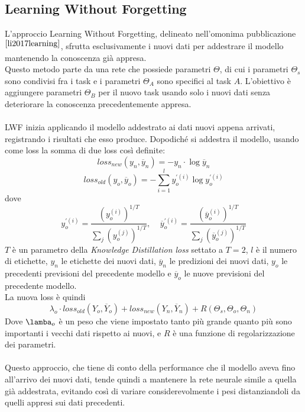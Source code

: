 \subsection{Learning Without Forgetting}
L'approccio Learning Without Forgetting, delineato nell'omonima pubblicazione$^{\cite{li2017learning}}$, sfrutta esclusivamente i nuovi dati per addestrare il modello mantenendo la conoscenza già appresa.\\
Questo metodo parte da una rete che possiede parametri $\Theta$, di cui i parametri $\Theta_s$ sono condivisi fra i task e i parametri $\Theta_A$ sono specifici al task $A$. L'obiettivo è aggiungere parametri $\Theta_B$ per il nuovo task usando solo i nuovi dati senza deteriorare la conoscenza precedentemente appresa.\\\\
LWF inizia applicando il modello addestrato ai dati nuovi appena arrivati, registrando i risultati che esso produce. Dopodiché si addestra il modello, usando come loss la somma di due loss così definite:
\begin{equation}\label{eq:lwf_lossnew}
    loss_{new}(y_n, \overline{y}_n) = -y_n\cdot\log\overline{y}_n
\end{equation}
\begin{equation}\label{eq:lwf_lossnew}
    loss_{old}(y_o, \overline{y}_o) = -\sum_{i=1}^l y_o^{'(i)}\log y_o^{'(i)}
\end{equation}
dove
\begin{equation}\label{eq:lwf_lossnew}
    y_o^{'(i)} = \frac{\left(y_o^{(i)}\right)^{1/T}}{\sum_j \left(y_o^{(j)}\right)^{1/T}},\:\:\:\:\:
    \overline{y}_o^{'(i)} = \frac{\left(\overline{y}_o^{(i)}\right)^{1/T}}{\sum_j \left(\overline{y}_o^{(j)}\right)^{1/T}}
\end{equation}
$T$ è un parametro della \textit{Knowledge Distillation loss} settato a $T = 2$, $l$ è il numero di etichette, $y_n$ le etichette dei nuovi dati, $\overline{y}_n$ le predizioni dei nuovi dati, $y_o$ le precedenti previsioni del precedente modello e $\overline{y}_o$ le nuove previsioni del precedente modello.\\
La nuova loss è quindi
\begin{equation}\label{eq:lwf_loss}
    \lambda_o\cdot loss_{old}(Y_o, \overline{Y}_o) + loss_{new}(Y_n, \overline{Y}_n) + R(\Theta_s, \Theta_o, \Theta_n)
\end{equation}
Dove $\lamba_o$ è un peso che viene impostato tanto più grande quanto più sono importanti i vecchi dati rispetto ai nuovi, e $R$ è una funzione di regolarizzazione dei parametri.\\\\
Questo approccio, che tiene di conto della performance che il modello aveva fino all'arrivo dei nuovi dati, tende quindi a mantenere la rete neurale simile a quella già addestrata, evitando così di variare considerevolmente i pesi distanziandoli da quelli appresi sui dati precedenti.

